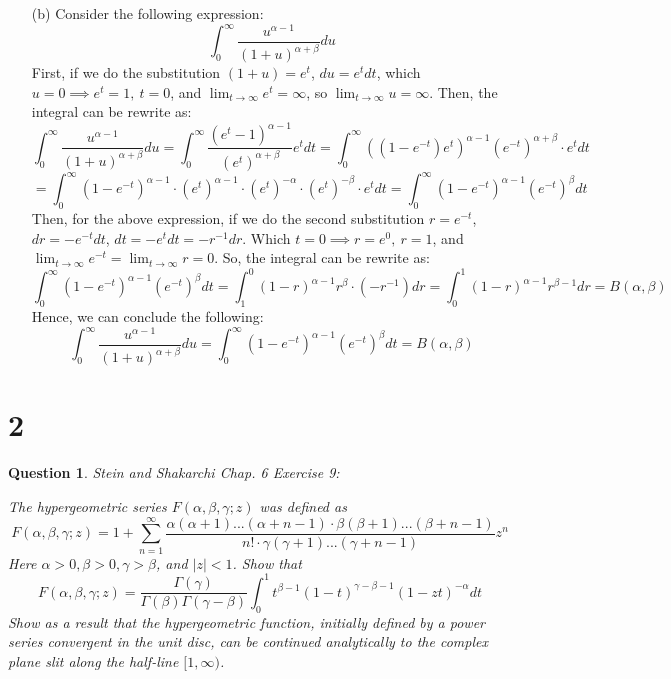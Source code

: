 \documentclass{article}
\newtheorem{question}{Question}
\begin{document}
\begin{itemize}
    \item[(b)] Consider the following expression:
    $$\int_{0}^{\infty}\frac{u^{\alpha-1}}{(1+u)^{\alpha+\beta}}du$$
    First, if we do the substitution $(1+u)=e^t$, $du=e^tdt$, which $u=0\implies e^t=1,\ t=0$, and $\lim_{t\rightarrow\infty}e^t=\infty$, so $\lim_{t\rightarrow\infty}u=\infty$. Then, the integral can be rewrite as:
    $$\int_{0}^{\infty}\frac{u^{\alpha-1}}{(1+u)^{\alpha+\beta}}du=\int_{0}^{\infty}\frac{(e^t-1)^{\alpha-1}}{(e^t)^{\alpha+\beta}}e^tdt=\int_{0}^{\infty}((1-e^{-t})e^t)^{\alpha-1}(e^{-t})^{\alpha+\beta}\cdot e^tdt$$
    $$=\int_{0}^{\infty}(1-e^{-t})^{\alpha-1}\cdot (e^{t})^{\alpha-1}\cdot (e^{t})^{-\alpha}\cdot (e^t)^{-\beta}\cdot e^tdt = \int_{0}^{\infty}(1-e^{-t})^{\alpha-1}(e^{-t})^\beta dt$$
    Then, for the above expression, if we do the second substitution $r=e^{-t}$, $dr=-e^{-t}dt$, $dt=-e^tdt = -r^{-1}dr$. Which $t=0\implies r=e^0,\ r=1$, and $\lim_{t\rightarrow\infty}e^{-t}=\lim_{t\rightarrow\infty}r=0$. So, the integral can be rewrite as:
    $$\int_{0}^{\infty}(1-e^{-t})^{\alpha-1}(e^{-t})^\beta dt=\int_{1}^{0}(1-r)^{\alpha-1}r^{\beta}\cdot (-r^{-1})dr = \int_{0}^{1}(1-r)^{\alpha-1}r^{\beta-1}dr = B(\alpha,\beta)$$
    Hence, we can conclude the following:
    $$\int_{0}^{\infty}\frac{u^{\alpha-1}}{(1+u)^{\alpha+\beta}}du=\int_{0}^{\infty}(1-e^{-t})^{\alpha-1}(e^{-t})^\beta dt=B(\alpha,\beta)$$
\end{itemize}

\hfil

\hfil

\section*{2}
\begin{myBox}[]{}
    \begin{question}
        Stein and Shakarchi Chap. 6 Exercise 9:

        The hypergeometric series $F(\alpha,\beta,\gamma; z)$ was defined as 
        $$F(\alpha,\beta,\gamma;z)=1+\sum_{n=1}^{\infty}\frac{\alpha(\alpha+1)...(\alpha+n-1)\cdot \beta(\beta+1)...(\beta+n-1)}{n!\cdot \gamma(\gamma+1)...(\gamma+n-1)}z^n$$
        Here $\alpha>0,\beta>0,\gamma>\beta$, and $|z|<1$. Show that
        $$F(\alpha,\beta,\gamma;z)=\frac{\Gamma(\gamma)}{\Gamma(\beta)\Gamma(\gamma-\beta)}\int_{0}^{1}t^{\beta-1}(1-t)^{\gamma-\beta-1}(1-zt)^{-\alpha}dt$$
        Show as a result that the hypergeometric function, initially defined by a power series convergent in the unit disc, can be continued analytically to the complex plane slit along the half-line $[1,\infty)$.
    \end{question}
\end{myBox}
\end{document}
